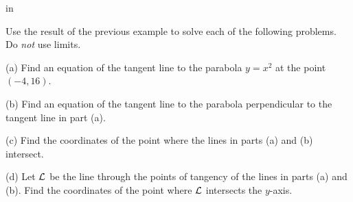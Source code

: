\documentclass{ximera}
\newcommand{\pskip}{\vskip 0.1 in}
\begin{document}
\pskip

\begin{example} \label{Ex:3245trg}
Use the result of the previous example to solve each of the following problems. Do \emph{not} use limits.

(a) Find an equation of the tangent line to the parabola $y=x^2$ at the point $(-4,16)$.

(b) Find an equation of the tangent line to the parabola perpendicular to the tangent line in part (a).

(c) Find the coordinates of the point where the lines in parts (a) and (b) intersect.

(d) Let ${\cal L}$ be the line through the points of tangency of the lines in parts (a) and (b). Find the coordinates of the point where ${\cal L}$ intersects the $y$-axis.




\end{example}
\end{document}
